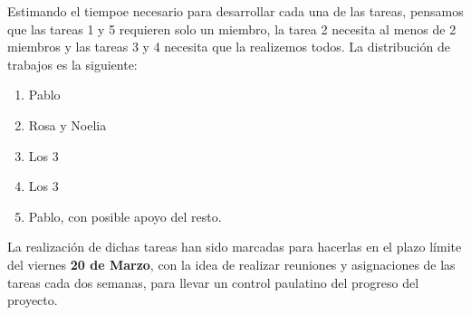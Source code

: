 \documentclass[a4paper,10pt]{article}
\begin{document}
\noindent Estimando el tiempoe necesario para desarrollar cada una de
las tareas, pensamos que las tareas 1 y 5 requieren solo un
miembro, la tarea 2 necesita al menos de 2 miembros y las tareas 3 y 4
necesita que la realizemos todos. La distribución de trabajos es
la siguiente:

\begin{enumerate}
\item Pablo
\item Rosa y Noelia
\item Los 3
\item Los 3
\item Pablo, con posible apoyo del resto.
\end{enumerate}

\noindent La realización de dichas tareas han sido marcadas para
hacerlas en el plazo límite del viernes \textbf{20 de Marzo}, con la
idea de realizar reuniones y asignaciones de las tareas cada dos
semanas, para llevar un control paulatino del progreso del proyecto.
\end{document}

